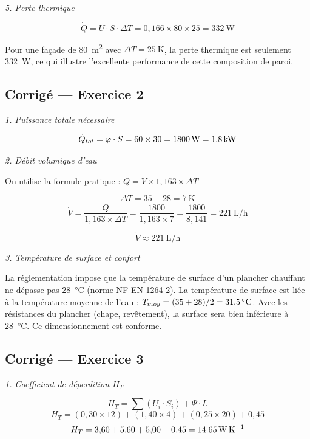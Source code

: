 \textit{5. Perte thermique}

\[
  \dot{Q} = U \cdot S \cdot \Delta T = 0{,}166 \times 80 \times 25 = \SI{332}{\watt}
\]

Pour une façade de \SI{80}{\meter\squared} avec \(\Delta T = \SI{25}{\kelvin}\), la perte
thermique est seulement \SI{332}{\watt}, ce qui illustre l'excellente performance de cette
composition de paroi.


\subsection*{Corrigé — Exercice 2}

\textit{1. Puissance totale nécessaire}

\[
  \dot{Q}_{tot} = \varphi \cdot S = 60 \times 30 = \SI{1800}{\watt} = \SI{1{,}8}{\kilo\watt}
\]

\textit{2. Débit volumique d'eau}

On utilise la formule pratique : \(\dot{Q} = \dot{V} \times 1{,}163 \times \Delta T\)

\[
  \Delta T = 35 - 28 = \SI{7}{\kelvin}
\]
\[
  \dot{V} = \frac{\dot{Q}}{1{,}163 \times \Delta T} = \frac{1800}{1{,}163 \times 7}
  = \frac{1800}{8{,}141} = \SI{221}{\liter\per\hour}
\]

\[
  \boxed{\dot{V} \approx \SI{221}{\liter\per\hour}}
\]

\textit{3. Température de surface et confort}

La réglementation impose que la température de surface d'un plancher chauffant ne dépasse pas
\SI{28}{\degreeCelsius} (norme NF EN 1264-2). La température de surface est liée à la
température moyenne de l'eau : \(T_{moy} = (35+28)/2 = \SI{31{,}5}{\degreeCelsius}\). Avec
les résistances du plancher (chape, revêtement), la surface sera bien inférieure à
\SI{28}{\degreeCelsius}. Ce dimensionnement est conforme.


\subsection*{Corrigé — Exercice 3}

\textit{1. Coefficient de déperdition \(H_T\)}

\[
  H_T = \sum (U_i \cdot S_i) + \Psi \cdot L
\]
\[
  H_T = (0{,}30 \times 12) + (1{,}40 \times 4) + (0{,}25 \times 20) + 0{,}45
\]
\[
  H_T = 3{,}60 + 5{,}60 + 5{,}00 + 0{,}45 = \SI{14{,}65}{\watt\per\kelvin}
\]


